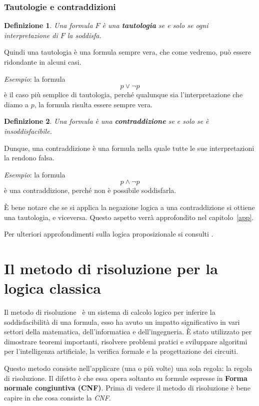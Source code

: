 \documentclass[a4paper,12pt]{report}
\newtheorem{definition}{Definizione}[section]
\begin{document}
\subsection{Tautologie e contraddizioni}
\label{taut-contr}
\begin{definition}
    Una formula $F$ è una \textbf{tautologia} se e solo se ogni interpretazione di $F$ la soddisfa.
\end{definition}
\noindent Quindi una tautologia è una formula sempre vera, che come vedremo, può essere ridondante in alcuni casi.

\emph{Esempio}: la formula
\[p \lor \lnot p\]
è il caso più semplice di tautologia, perché qualunque sia l'interpretazione che diamo a $p$, la formula risulta essere sempre vera.

\begin{definition}
    Una formula è una \textbf{contraddizione} se e solo se è insoddisfacibile.
\end{definition}
\noindent Dunque, una contraddizione è una formula nella quale tutte le sue interpretazioni la rendono falsa.

\emph{Esempio}: la formula
\[p \land \lnot p\]
è una contraddizione, perché non è possibile soddisfarla.

\`E bene notare che se si applica la negazione logica a una contraddizione si ottiene una tautologia, e viceversa. Questo aspetto verrà approfondito nel capitolo~\ref{app}.

Per ulteriori approfondimenti sulla logica proposizionale si consulti \cite{logica_prop}.

% 
% 
\chapter{Il metodo di risoluzione per la logica classica}
\label{resol}
Il metodo di risoluzione~\cite{res_calculus} è un sistema di calcolo logico per inferire la soddisfacibilità di una formula, esso ha avuto un impatto significativo in vari settori della matematica, dell'informatica e dell'ingegneria. È stato utilizzato per dimostrare teoremi importanti, risolvere problemi pratici e sviluppare algoritmi per l'intelligenza artificiale, la verifica formale e la progettazione dei circuiti.

Questo metodo consiste nell'applicare (una o più volte) una sola regola: la regola di risoluzione. Il difetto è che essa opera soltanto su formule espresse in \textbf{Forma normale congiuntiva (CNF)}. Prima di vedere il metodo di risoluzione è bene capire in che cosa consiste la \emph{CNF}.
\end{document}

